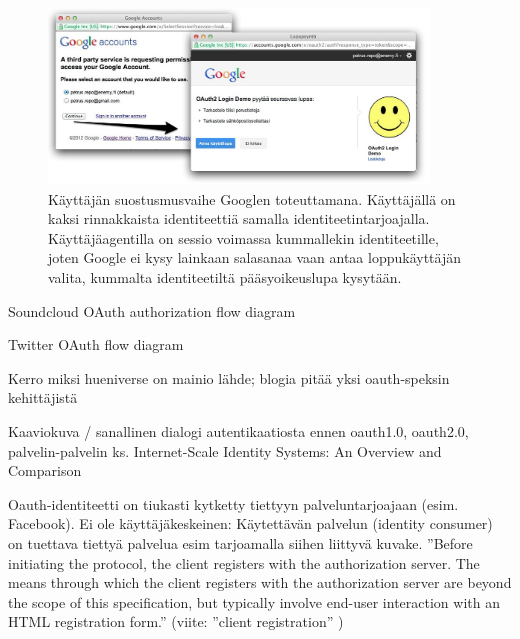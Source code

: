 \documentclass[finnish,gradu]{tktltiki}
\begin{document}
  \begin{figure}
    \centering
    \includegraphics[width=0.9\textwidth]{images/google_id_and_user_consent.jpg}
    \caption{Käyttäjän suostusmusvaihe Googlen toteuttamana. Käyttäjällä on kaksi rinnakkaista identiteettiä samalla identiteetintarjoajalla. Käyttäjäagentilla on sessio voimassa kummallekin identiteetille, joten Google ei kysy lainkaan salasanaa vaan antaa loppukäyttäjän valita, kummalta identiteetiltä pääsyoikeuslupa kysytään.}
    \label{fig:google_id_and_user_consent}
  \end{figure}



  Soundcloud OAuth authorization flow diagram %

  Twitter OAuth flow diagram

  Kerro miksi hueniverse on mainio lähde; blogia pitää yksi oauth-speksin kehittäjistä


  Kaaviokuva / sanallinen dialogi autentikaatiosta ennen oauth1.0, oauth2.0, palvelin-palvelin
  ks. Internet-Scale Identity Systems: An Overview and Comparison

  Oauth-identiteetti on tiukasti kytketty tiettyyn palveluntarjoajaan (esim. Facebook).
  Ei ole käyttäjäkeskeinen: Käytettävän palvelun (identity consumer) on tuettava tiettyä palvelua esim tarjoamalla siihen liittyvä kuvake.
  ''Before initiating the protocol, the client registers with the authorization server. The means through which the client registers with the authorization
  server are beyond the scope of this specification, but typically involve end-user interaction with an HTML registration form.'' (viite: ''client registration'' \cite{ietf_oauth2})
\end{document}
